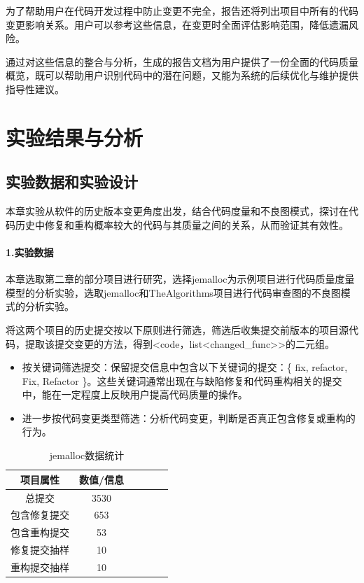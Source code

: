 为了帮助用户在代码开发过程中防止变更不完全，报告还将列出项目中所有的代码变更影响关系。用户可以参考这些信息，在变更时全面评估影响范围，降低遗漏风险。

通过对这些信息的整合与分析，生成的报告文档为用户提供了一份全面的代码质量概览，既可以帮助用户识别代码中的潜在问题，又能为系统的后续优化与维护提供指导性建议。

\section{实验结果与分析}

\subsection{实验数据和实验设计}

本章实验从软件的历史版本变更角度出发，结合代码度量和不良图模式，探讨在代码历史中修复和重构概率较大的代码与其质量之间的关系，从而验证其有效性。

\paragraph{1.实验数据} 本章选取第二章的部分项目进行研究，选择jemalloc为示例项目进行代码质量度量模型的分析实验，选取jemalloc和TheAlgorithms项目进行代码审查图的不良图模式的分析实验。

将这两个项目的历史提交按以下原则进行筛选，筛选后收集提交前版本的项目源代码，提取该提交变更的方法，得到<code，list<changed\_func>>的二元组。

\begin{itemize}
    \item 按关键词筛选提交：保留提交信息中包含以下关键词的提交：\{ fix, refactor, Fix, Refactor \}。这些关键词通常出现在与缺陷修复和代码重构相关的提交中，能在一定程度上反映用户提高代码质量的操作。
    \item 进一步按代码变更类型筛选：分析代码变更，判断是否真正包含修复或重构的行为。
\end{itemize}

\begin{table}[htbp]
\caption{jemalloc数据统计}
\vspace{0.5em}\centering\wuhao
\begin{tabular}{cccccc}
\toprule
项目属性 & 数值/信息 \\
\midrule
总提交 & 3530 \\
包含修复提交 & 653  \\
包含重构提交 & 53  \\
修复提交抽样 & 10 \\
重构提交抽样 &  10 \\
\bottomrule
\end{tabular}
\end{table}

